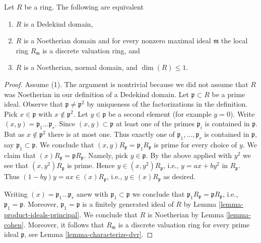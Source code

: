 \begin{lemma}
\label{lemma-characterize-Dedekind}
Let $R$ be a ring. The following are equivalent
\begin{enumerate}
\item $R$ is a Dedekind domain,
\item $R$ is a Noetherian domain and for every nonzero maximal ideal
$\mathfrak m$ the local ring $R_{\mathfrak m}$ is a discrete valuation ring, and
\item $R$ is a Noetherian, normal domain, and $\dim(R) \leq 1$.
\end{enumerate}
\end{lemma}

\begin{proof}
Assume (1). The argument is nontrivial because we did not assume that $R$
was Noetherian in our definition of a Dedekind domain. Let
$\mathfrak p \subset R$ be a prime ideal. Observe that
$\mathfrak p \not = \mathfrak p^2$ by uniqueness
of the factorizations in the definition. Pick $x \in \mathfrak p$
with $x \not \in \mathfrak p^2$. Let $y \in \mathfrak p$ be a
second element (for example $y = 0$).
Write $(x, y) = \mathfrak p_1 \ldots \mathfrak p_r$.
Since $(x, y) \subset \mathfrak p$ at least one of the primes
$\mathfrak p_i$ is contained in $\mathfrak p$.
But as $x \not \in \mathfrak p^2$ there is at most one.
Thus exactly one of $\mathfrak p_1, \ldots, \mathfrak p_r$ is contained
in $\mathfrak p$, say $\mathfrak p_1 \subset \mathfrak p$.
We conclude that $(x, y)R_\mathfrak p = \mathfrak p_1R_\mathfrak p$
is prime for every choice of $y$. We claim that
$(x)R_\mathfrak p = \mathfrak pR_\mathfrak p$. Namely,
pick $y \in \mathfrak p$. By the above applied with $y^2$ we see
that $(x, y^2)R_\mathfrak p$ is prime.
Hence $y \in (x, y^2)R_\mathfrak p$, i.e., $y = ax + by^2$ in
$R_\mathfrak p$. Thus $(1 - by)y = ax \in (x)R_\mathfrak p$, i.e.,
$y \in (x)R_\mathfrak p$ as desired.

\medskip\noindent
Writing $(x) = \mathfrak p_1 \ldots \mathfrak p_r$ anew with
$\mathfrak p_1 \subset \mathfrak p$ we conclude that
$\mathfrak p_1 R_\mathfrak p = \mathfrak p R_\mathfrak p$, i.e.,
$\mathfrak p_1 = \mathfrak p$. Moreover, $\mathfrak p_1 = \mathfrak p$ is
a finitely generated ideal of $R$ by
Lemma \ref{lemma-product-ideals-principal}.
We conclude that $R$ is Noetherian by Lemma \ref{lemma-cohen}.
Moreover, it follows that $R_\mathfrak m$ is a discrete
valuation ring for every prime ideal $\mathfrak p$, see
Lemma \ref{lemma-characterize-dvr}.


\end{proof}
